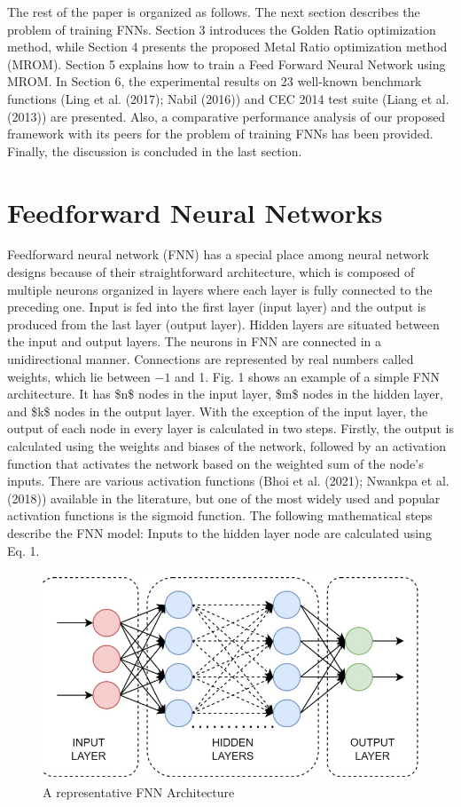 The rest of the paper is organized as follows. The next section describes the problem of training FNNs. Section 3 introduces the Golden Ratio optimization method, while Section 4 presents the proposed Metal Ratio optimization method (MROM). Section 5 explains how to train a Feed Forward Neural Network using MROM. In Section 6, the experimental results on 23 well-known benchmark functions (Ling et al. (2017); Nabil (2016)) and CEC 2014 test suite (Liang et al. (2013)) are presented. Also, a comparative performance analysis of our proposed framework with its peers for the problem of training FNNs has been provided. Finally, the discussion is concluded in the last section.

\section{Feedforward Neural Networks}

Feedforward neural network (FNN) has a special place among neural network designs because of their straightforward architecture, which is composed of multiple neurons organized in layers where each layer is fully connected to the preceding one. Input is fed into the first layer (input layer) and the output is produced from the last layer (output layer). Hidden layers are situated between the input and output layers. The neurons in FNN are connected in a unidirectional manner. Connections are represented by real numbers called weights, which lie between $-1$ and 1. Fig. 1 shows an example of a simple FNN architecture. It has \$n\$ nodes in the input layer, \$m\$ nodes in the hidden layer, and \$k\$ nodes in the output layer. With the exception of the input layer, the output of each node in every layer is calculated in two steps. Firstly, the output is calculated using the weights and biases of the network, followed by an activation function that activates the network based on the weighted sum of the node’s inputs. There are various activation functions (Bhoi et al. (2021); Nwankpa et al. (2018)) available in the literature, but one of the most widely used and popular activation functions is the sigmoid function. The following mathematical steps describe the FNN model: Inputs to the hidden layer node are calculated using Eq. 1.

\begin{figure}[htbp]
\centering
\includegraphics[width=0.8\linewidth]{images/59ed231f5c3bbfd5ce998621c0b6757d10ca1f1a3443b0461a6dc4d1e31e3f1b.jpg}
\caption{A representative FNN Architecture}
\label{fig:1}
\end{figure}


